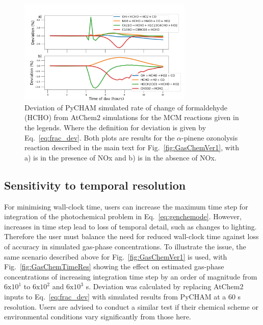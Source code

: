 \documentclass[gmd, manuscript]{copernicus}
\begin{document}
\begin{figure}[t]
\includegraphics[width=8.3cm]{Results/photo_chem_grad_dev.png}
\caption{Deviation of PyCHAM simulated rate of change of formaldehyde (HCHO) from AtChem2 simulations for the MCM reactions given in the legends.  Where the definition for deviation is given by Eq.~\ref{eq:frac_dev}.  Both plots are results for the $\alpha$-pinene ozonolysis reaction described in the main text for Fig.~\ref{fig:GasChemVer1}, with a) is in the presence of NOx and b) is in the absence of NOx.}
\label{fig:GasChemVer2}
\end{figure}


\subsection{Sensitivity to temporal resolution}

For minimising wall-clock time, users can increase the maximum time step for integration of the photochemical problem in Eq.~\ref{eq:genchemode}.  However, increases in time step lead to loss of temporal detail, such as changes to lighting.  Therefore the user must balance the need for reduced wall-clock time against loss of accuracy in simulated gas-phase concentrations.  To illustrate the issue, the same scenario described above for Fig.~\ref{fig:GasChemVer1} is used, with Fig.~\ref{fig:GasChemTimeRes} showing the effect on estimated gas-phase concentrations of increasing integration time step by an order of magnitude from $\mathrm{6x10^1}$ to $\mathrm{6x10^2}$ and $\mathrm{6x10^3}$ s.  Deviation was calculated by replacing AtChem2 inputs to Eq.~\ref{eq:frac_dev} with simulated results from PyCHAM at a 60 s resolution.  Users are advised to conduct a similar test if their chemical scheme or environmental conditions vary significantly from those here.
\end{document}
